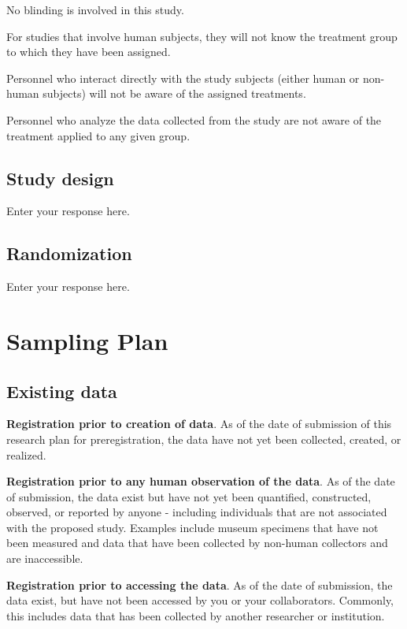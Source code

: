 \documentclass[]{article}
\begin{document}
No blinding is involved in this study.

For studies that involve human subjects, they will not know the
treatment group to which they have been assigned.

Personnel who interact directly with the study subjects (either human or
non-human subjects) will not be aware of the assigned treatments.

Personnel who analyze the data collected from the study are not aware of
the treatment applied to any given group.

\hypertarget{study-design}{%
\subsection{Study design}\label{study-design}}

Enter your response here.

\hypertarget{randomization}{%
\subsection{Randomization}\label{randomization}}

Enter your response here.

\hypertarget{sampling-plan}{%
\section{Sampling Plan}\label{sampling-plan}}

\hypertarget{existing-data}{%
\subsection{Existing data}\label{existing-data}}

\textbf{Registration prior to creation of data}. As of the date of
submission of this research plan for preregistration, the data have not
yet been collected, created, or realized.

\textbf{Registration prior to any human observation of the data}. As of
the date of submission, the data exist but have not yet been quantified,
constructed, observed, or reported by anyone - including individuals
that are not associated with the proposed study. Examples include museum
specimens that have not been measured and data that have been collected
by non-human collectors and are inaccessible.

\textbf{Registration prior to accessing the data}. As of the date of
submission, the data exist, but have not been accessed by you or your
collaborators. Commonly, this includes data that has been collected by
another researcher or institution.
\end{document}
